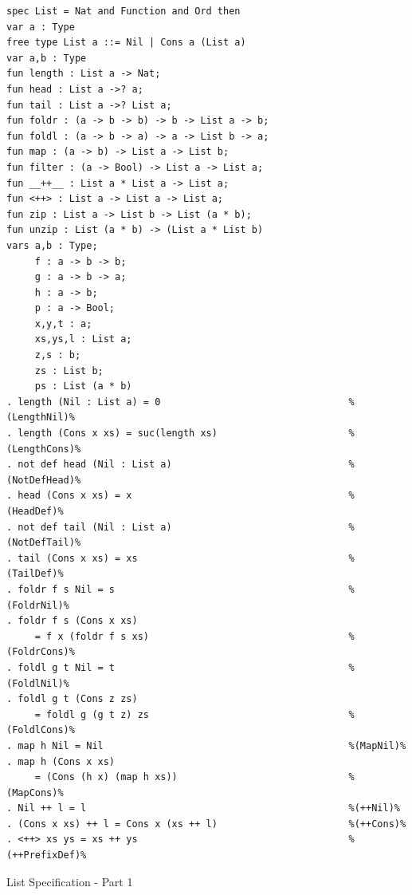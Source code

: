 \documentclass[12pt,twoside]{article}
\numberwithin{spec}{subsection}
\numberwithin{proof}{subsection}
\numberwithin{figure}{subsection}
\numberwithin{code}{subsection}
\begin{document}
\begin{spec}\capstart
\begin{verbatim}
spec List = Nat and Function and Ord then
var a : Type
free type List a ::= Nil | Cons a (List a)
var a,b : Type
fun length : List a -> Nat;
fun head : List a ->? a;
fun tail : List a ->? List a;
fun foldr : (a -> b -> b) -> b -> List a -> b;
fun foldl : (a -> b -> a) -> a -> List b -> a;
fun map : (a -> b) -> List a -> List b;
fun filter : (a -> Bool) -> List a -> List a;
fun __++__ : List a * List a -> List a;
fun <++> : List a -> List a -> List a;
fun zip : List a -> List b -> List (a * b);
fun unzip : List (a * b) -> (List a * List b)
vars a,b : Type; 
     f : a -> b -> b; 
     g : a -> b -> a;
     h : a -> b; 
     p : a -> Bool; 
     x,y,t : a; 
     xs,ys,l : List a; 
     z,s : b; 
     zs : List b; 
     ps : List (a * b)
. length (Nil : List a) = 0                                 %(LengthNil)%
. length (Cons x xs) = suc(length xs)                       %(LengthCons)%
. not def head (Nil : List a)                               %(NotDefHead)%
. head (Cons x xs) = x                                      %(HeadDef)%
. not def tail (Nil : List a)                               %(NotDefTail)%
. tail (Cons x xs) = xs                                     %(TailDef)%
. foldr f s Nil = s                                         %(FoldrNil)%
. foldr f s (Cons x xs) 
     = f x (foldr f s xs)                                   %(FoldrCons)%
. foldl g t Nil = t                                         %(FoldlNil)%
. foldl g t (Cons z zs) 
     = foldl g (g t z) zs                                   %(FoldlCons)%
. map h Nil = Nil                                           %(MapNil)%
. map h (Cons x xs)       
     = (Cons (h x) (map h xs))                              %(MapCons)%
. Nil ++ l = l                                              %(++Nil)%
. (Cons x xs) ++ l = Cons x (xs ++ l)                       %(++Cons)%
. <++> xs ys = xs ++ ys                                     %(++PrefixDef)%
\end{verbatim}
\caption{List Specification - Part 1}
\label{spec:List}
\end{spec}
\end{document}
